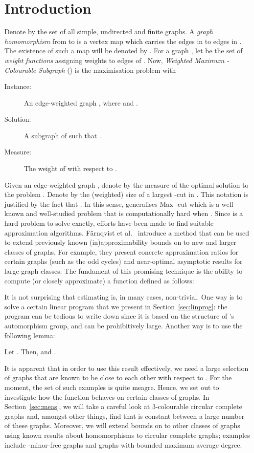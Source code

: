 \documentclass[11pt,a4paper]{article}
\begin{document}
\section{Introduction}
Denote by  the set of all simple, undirected and
finite graphs. 
A \emph{graph homomorphism} from  to  is a vertex map which
carries the edges in  to edges in .
The existence of such a map will be denoted by .
For a graph , let
 be the set of \emph{weight functions}
 assigning weights
to edges of .
Now,
  {\em Weighted Maximum -Colourable Subgraph} () is the
maximisation problem with
  \begin{description}
  \item[Instance:] An edge-weighted graph , where  and
    .
  \item[Solution:] A subgraph  of  such that .
  \item[Measure:] The weight of  with respect to .
  \end{description}

\noindent
Given an edge-weighted graph , denote by  the measure
of the optimal solution to the problem .
Denote by  the
(weighted) size of a largest -cut in .
This notation is justified by the fact that
.
In this sense,  generalises {\sc Max -cut} which is a
well-known and well-studied problem that is computationally hard
when .
Since  is a hard problem to solve exactly, efforts have been
made to find suitable approximation algorithms.
F\"arnqvist et al.~\cite{farnqvist:etal:09} introduce a
method that can be used to extend previously known
(in)approximability bounds on  to new and larger classes of
graphs. For example, they 
present concrete approximation ratios for certain graphs (such as the odd cycles) 
and
near-optimal asymptotic results for large graph classes.
The fundament of this promising technique is the ability to compute 
(or closely approximate) a function
 defined as follows: 


It is not surprising that estimating  
is, in many cases,
non-trivial. One way is to solve a certain linear program that
we present in Section~\ref{sec:linprog}: the program
can be tedious to write down since it is based on the structure
of 's automorphism group, and can be prohibitively large.
Another way is to use the following lemma:

\begin{lemma}
\label{lem:sandwich}
Let . Then,  and
.
\end{lemma}

It is apparent that in order to use this result effectively, we need a large
selection of graphs  that are known to be close to each other with respect
to . For the moment, the set of such examples is quite meagre.
Hence, we set out to investigate how the function  behaves on
certain classes of graphs. In Section~\ref{sec:meas}, we will take a careful
look at 3-colourable circular complete graphs and, amongst other things,
find that  is constant between a large number of these graphs.
Moreover, we will extend bounds on  to other classes of graphs using
known results about homomorphisms to circular complete graphs; 
examples include -minor-free graphs and graphs with bounded
maximum average degree. 
\end{document}

